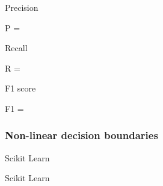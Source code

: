 \begin{frame}{Precision}
  \vspace{1cm}

  \begin{mphrase}
    P = 
  \end{mphrase}
\end{frame}

\begin{frame}{Recall}
  \vspace{1cm}

  \begin{mphrase}
    R = 
  \end{mphrase}
\end{frame}

\begin{frame}{F1 score}
  \vspace{1cm}

  \begin{mphrase}
    F1 = 
  \end{mphrase}
\end{frame}

\begin{frame}
  \frametitle{Non-linear decision boundaries}
   {

    \vfill
  }
   {
    \vspace{1cm}
  }
   {
    \vspace{1cm}
  }
\end{frame}

\begin{frame}{Scikit Learn}
  
\end{frame}

\begin{frame}{Scikit Learn}
  
\end{frame}


